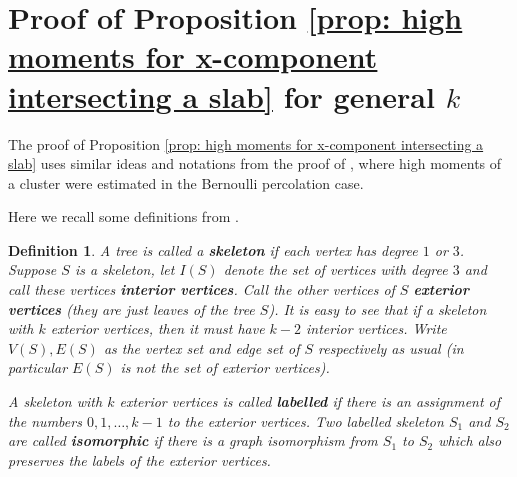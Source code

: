 \documentclass[12pt]{article}
\newtheorem{definition}[theorem]{Definition}
\numberwithin{equation}{section}
\newcommand{\1}{\mathbf{1}}
\newcommand{\notion}[1]{{\bf  \textit{#1}}}
\begin{document}
\section{Proof of Proposition \ref{prop: high moments for x-component intersecting a slab} for general $k$}\label{sec: appendix B}
The proof of Proposition \ref{prop: high moments for x-component intersecting a slab} uses similar ideas and notations from the proof of \cite[Theorem 6.75]{Grimmett1999}, where  high moments of a cluster were estimated in the Bernoulli percolation case. 

Here we recall some definitions from \cite[Page 135]{Grimmett1999}. 
\begin{definition}
	A tree is called a \notion{skeleton} if each vertex has degree $1$ or $3$. Suppose $S$ is a skeleton, let $I(S)$ denote the set of vertices with degree $3$ and call these vertices \notion{interior vertices}. Call the other vertices of $S$ \notion{exterior vertices} (they are just leaves of the tree $S$). It is easy to see that if a skeleton with $k$ exterior vertices, then it must have $k-2$ interior vertices. Write $V(S), E(S)$ as the vertex set and edge set of $S$ respectively as usual (in particular $E(S)$ is not the set of exterior vertices).
	
	
	A skeleton with $k$ exterior vertices is called \notion{labelled} if there is an assignment of the numbers $0,1,\ldots,k-1$ to the exterior vertices. Two labelled skeleton $S_1$ and $S_2$ are called \notion{isomorphic} if there is a graph isomorphism from $S_1$ to $S_2$ which also preserves the labels of the exterior vertices. 
\end{definition}
\end{document}
